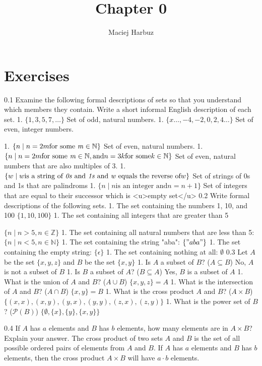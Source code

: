 \documentclass[12pt, a4paper]{article}
\title{Chapter 0}
\author{Maciej Harbuz}
\begin{document}
\maketitle

\section{Exercises}

0.1
Examine the following formal descriptions of sets so that you understand which members they contain. Write a short informal English description of each set.
1. $\{1, 3, 5, 7, \ldots \}$
Set of odd, natural numbers.
1. $\{x \ldots, -4, -2, 0, 2, 4 \ldots \}$
Set of even, integer numbers.

1. $\{n \mid n = 2m \text{for some \textit{m}} \in \mathbb{N} \}$
Set of even, natural numbers.
1. $\{n \mid n = 2m \text{for some \textit{m}} \in \mathbb{N}, \text{and} n = 3k \text{for some} k \in \mathbb{N} \}$
Set of even, natural numbers that are also multiples of 3.
1. $\{w \mid w  \text{is a string of \textit{0s} and \textit{1s} and \textit{w} equals the reverse of} w\}$
Set of strings of 0s and 1s that are palindroms 
1. $\{ n \mid n \text{is an integer and}  n = n+1\}$
Set of integers that are equal to their successor which is <u>empty set</u>
0.2
Write  formal descriptions  of the following sets.
1. The set containing the numbers 1, 10, and 100
    $\{1, 10, 100\}$
1. The set containing all integers that are greater than 5
    

    $\{n \mid n > 5, n \in \mathbb{Z}\}$
1.  The set containing all natural numbers that are less than 5:
    $\{n \mid n < 5, n \in \mathbb{N}\}$
1. The set containing the string "aba":
    $\{"aba"\}$
1. The set containing the empty string:
    $\{\epsilon\}$
1. The set containing nothing at all:
    $\emptyset$
0.3
Let $A$ be the set $\{x,y,z\}$ and $B$ be the set $\{x,y\}$
1. Is $A$ a subset of $B$? ($A \subseteq B$) 
    No, $A$ is not a subset of $B$
1. Is $B$ a subset of $A$? ($B \subseteq A$) 
    Yes, $B$ is a subset of $A$
1. What is the union of $A$ and $B$? ($A \cup B$) 
    $\{x,y,z\} = A$
1. What is the intersection of $A$ and $B$? ($A \cap B$) 
    $\{x,y\} = B$
1. What is the cross product $A$ and $B$? ($A \times B$) 
    $\{(x,x), (x,y), (y,x), (y,y), (z,x), (z,y)\}$
1. What is the power set of $B$? ($\mathcal{P}(B)$) 
    $\{\emptyset, \{x\}, \{y\}, \{x,y\}\}$

0.4
If $A$ has  $a$  elements and  $B$  has  $b$  elements, how many elements are in  $A \times B$? 
Explain your answer.
The cross product of two sets $A$ and $B$ is the set of all possible ordered pairs of elements from $A$ and $B$. If $A$ has $a$ elements and $B$ has $b$ elements, then the cross product $A \times B$ will have $a \cdot b$ elements.
\end{document}
